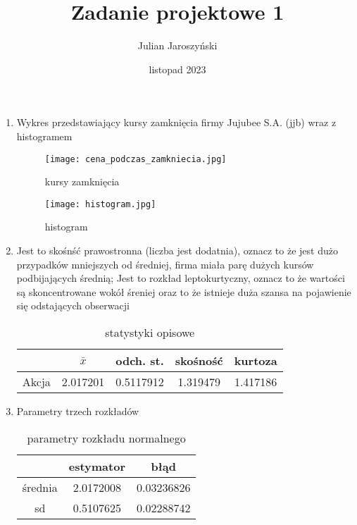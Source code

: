 \documentclass{article}
\title{Zadanie projektowe 1}
\author{Julian Jaroszyński}
\date{listopad 2023}
\begin{document}
\maketitle

\begin{enumerate}
	\item
		Wykres przedstawiający kursy zamknięcia firmy Jujubee S.A. (jjb) wraz z histogramem
		\begin{figure}[H]
			\centering
			\renewcommand\figurename{Wykres}
			\texttt{[image: cena\_podczas\_zamkniecia.jpg]}
			\caption{kursy zamknięcia}
		\end{figure}
		\begin{figure}[H]
			\centering
			\renewcommand\figurename{Wykres}
			\texttt{[image: histogram.jpg]}
			\caption{histogram}
		\end{figure}
	\newpage
	\item
		Jest to skośnść prawostronna (liczba jest dodatnia), oznacz to że jest
		dużo przypadków mniejszych od średniej, firma miała parę dużych kursów
		podbijających średnią;
		Jest to rozkład leptokurtyczny, oznacz to że wartości są skoncentrowane
		wokół śreniej oraz to że istnieje duża szansa na pojawienie się
		odstających obserwacji
		\begin{table}[h]
			\centering
			\renewcommand\tablename{Tabela}
			\begin{tabular}{|c|c|c|c|c|}
				\hline
				 & $\bar{x}$ & odch. st. & skośność & kurtoza \\
				\hline
				Akcja & 2.017201 & 0.5117912 & 1.319479 & 1.417186 \\
				\hline
			\end{tabular}
			\caption{statystyki opisowe}
			\label{tab:przyklad}
		\end{table}
	\newpage
	\item
		Parametry trzech rozkładów
		\begin{table}[h]
			\renewcommand\tablename{Tabela}
			\centering
			\begin{tabular}{|c|c|c|}
				\hline
				& estymator & błąd \\
				\hline
				średnia & 2.0172008 & 0.03236826\\
				\hline
				sd & 0.5107625 & 0.02288742\\
				\hline
			\end{tabular}
			\caption{parametry rozkładu normalnego}
		\end{table}
		\begin{table}[h]
			\renewcommand\tablename{Tabela}

\end{table}
\end{enumerate}
\end{document}

